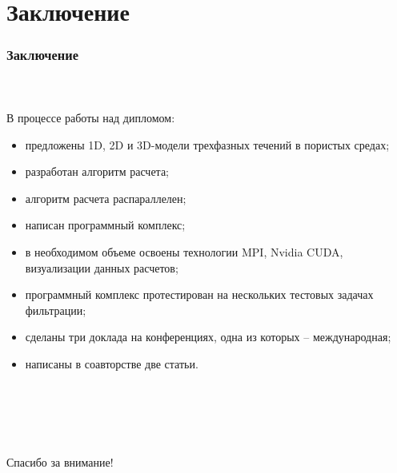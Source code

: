 \section{Заключение}
\begin{frame}
\begin{center}
\frametitle{Заключение}
\framesubtitle{\ }
В процессе работы над дипломом:
\begin{itemize}
  \item предложены 1D, 2D и 3D-модели трехфазных течений в пористых средах;
  \item разработан алгоритм расчета;
  \item алгоритм расчета распараллелен;
  \item написан программный комплекс;
  \item в необходимом объеме освоены технологии MPI, Nvidia CUDA, визуализации данных расчетов;
  \item программный комплекс протестирован на нескольких тестовых задачах 
  фильтрации;
  \item сделаны три доклада на конференциях, одна из которых -- международная;
  \item написаны в соавторстве две статьи.
\end{itemize}
\end{center}
\end{frame}

\begin{frame}
\begin{center}
\frametitle{\ }
\framesubtitle{\ }
\item {\huge Спасибо за внимание!}
\end{center}
\end{frame}